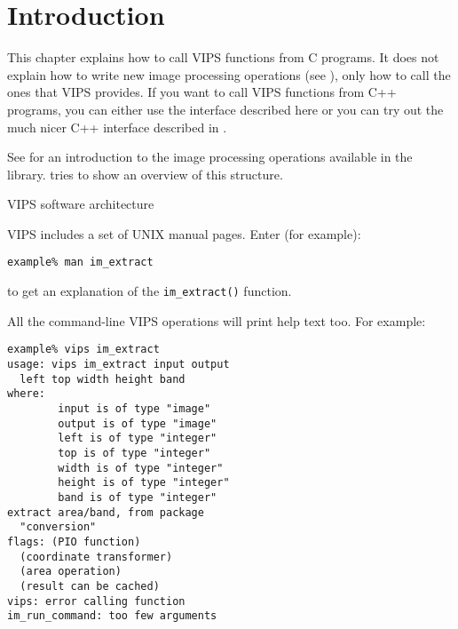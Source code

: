 \section{Introduction}

This chapter explains how to call VIPS functions from C programs. It does not
explain how to write new image processing operations (see ),
only how to call the ones that VIPS provides. If you want to call VIPS
functions from C++ programs, you can either use the interface described here
or you can try out the much nicer C++ interface described in .

See  for an introduction to the image processing operations
available in the library.  tries to show
an overview of this structure.

\begin{fig2}
\caption{VIPS software architecture}
\label{fg:architecture}
\end{fig2}

VIPS includes a set of UNIX manual pages. Enter (for example):

\begin{verbatim}
example% man im_extract
\end{verbatim}

\noindent
to get an explanation of the \verb+im_extract()+ function.

All the command-line VIPS operations will print help text too. For example:

\begin{verbatim}
example% vips im_extract
usage: vips im_extract input output 
  left top width height band
where:
        input is of type "image"
        output is of type "image"
        left is of type "integer"
        top is of type "integer"
        width is of type "integer"
        height is of type "integer"
        band is of type "integer"
extract area/band, from package 
  "conversion"
flags: (PIO function) 
  (coordinate transformer) 
  (area operation) 
  (result can be cached)
vips: error calling function
im_run_command: too few arguments
\end{verbatim}
